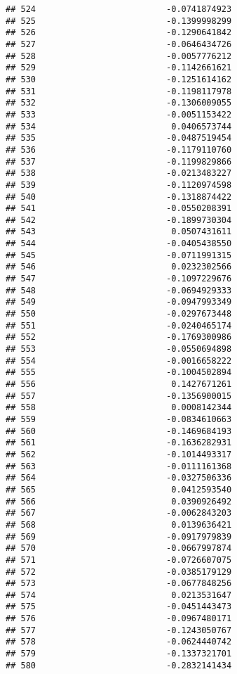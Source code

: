 \documentclass[
]{article}
\begin{document}
\begin{verbatim}
## 524                          -0.0741874923
## 525                          -0.1399998299
## 526                          -0.1290641842
## 527                          -0.0646434726
## 528                          -0.0057776212
## 529                          -0.1142661621
## 530                          -0.1251614162
## 531                          -0.1198117978
## 532                          -0.1306009055
## 533                          -0.0051153422
## 534                           0.0406573744
## 535                          -0.0487519454
## 536                          -0.1179110760
## 537                          -0.1199829866
## 538                          -0.0213483227
## 539                          -0.1120974598
## 540                          -0.1318874422
## 541                          -0.0550208391
## 542                          -0.1899730304
## 543                           0.0507431611
## 544                          -0.0405438550
## 545                          -0.0711991315
## 546                           0.0232302566
## 547                          -0.1097229676
## 548                          -0.0694929333
## 549                          -0.0947993349
## 550                          -0.0297673448
## 551                          -0.0240465174
## 552                          -0.1769300986
## 553                          -0.0550694898
## 554                          -0.0016658222
## 555                          -0.1004502894
## 556                           0.1427671261
## 557                          -0.1356900015
## 558                           0.0008142344
## 559                          -0.0834610663
## 560                          -0.1469684193
## 561                          -0.1636282931
## 562                          -0.1014493317
## 563                          -0.0111161368
## 564                          -0.0327506336
## 565                           0.0412593540
## 566                           0.0390926492
## 567                          -0.0062843203
## 568                           0.0139636421
## 569                          -0.0917979839
## 570                          -0.0667997874
## 571                          -0.0726607075
## 572                          -0.0385179129
## 573                          -0.0677848256
## 574                           0.0213531647
## 575                          -0.0451443473
## 576                          -0.0967480171
## 577                          -0.1243050767
## 578                          -0.0624440742
## 579                          -0.1337321701
## 580                          -0.2832141434

\end{verbatim}
\end{document}
